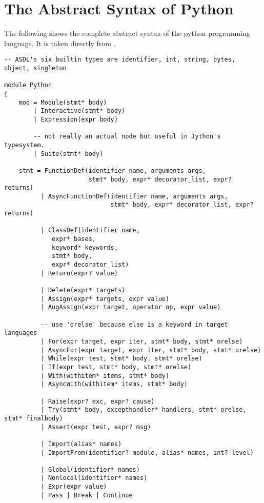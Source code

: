 \chapter{The Abstract Syntax of Python}\label{appendix:abstract_syntax}
The following shows the complete abstract syntax of the python programming language.
It is taken directly from \citet{ast_python}.

\begin{lstlisting}[style=default, caption={The abstract syntax of Python}, label={python_abstract_syntax}, breaklines=true]
-- ASDL's six builtin types are identifier, int, string, bytes, object, singleton

module Python
{
    mod = Module(stmt* body)
        | Interactive(stmt* body)
        | Expression(expr body)

        -- not really an actual node but useful in Jython's typesystem.
        | Suite(stmt* body)

    stmt = FunctionDef(identifier name, arguments args,
                       stmt* body, expr* decorator_list, expr? returns)
          | AsyncFunctionDef(identifier name, arguments args,
                             stmt* body, expr* decorator_list, expr? returns)

          | ClassDef(identifier name,
             expr* bases,
             keyword* keywords,
             stmt* body,
             expr* decorator_list)
          | Return(expr? value)

          | Delete(expr* targets)
          | Assign(expr* targets, expr value)
          | AugAssign(expr target, operator op, expr value)

          -- use 'orelse' because else is a keyword in target languages
          | For(expr target, expr iter, stmt* body, stmt* orelse)
          | AsyncFor(expr target, expr iter, stmt* body, stmt* orelse)
          | While(expr test, stmt* body, stmt* orelse)
          | If(expr test, stmt* body, stmt* orelse)
          | With(withitem* items, stmt* body)
          | AsyncWith(withitem* items, stmt* body)

          | Raise(expr? exc, expr? cause)
          | Try(stmt* body, excepthandler* handlers, stmt* orelse, stmt* finalbody)
          | Assert(expr test, expr? msg)

          | Import(alias* names)
          | ImportFrom(identifier? module, alias* names, int? level)

          | Global(identifier* names)
          | Nonlocal(identifier* names)
          | Expr(expr value)
          | Pass | Break | Continue


\end{lstlisting}
